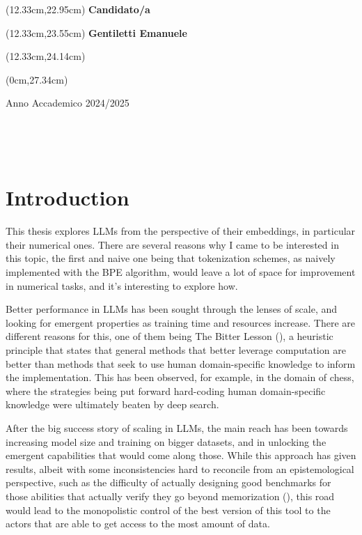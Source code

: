 \documentclass[
  a4paper, twoside, 10pt, titlepage]{book}
\begin{document}
\begin{textblock*}{8cm}(12.33cm,22.95cm)
	\noindent
	\textbf{Candidato/a}
\end{textblock*}
\begin{textblock*}{8cm}(12.33cm,23.55cm)
	\noindent	\textbf{Gentiletti Emanuele}
\end{textblock*}
\begin{textblock*}{8cm}(12.33cm,24.14cm)
\end{textblock*}

\begin{textblock*}{21cm}(0cm,27.34cm)
	\centerline{Anno Accademico 2024/2025}
\end{textblock*}

\endgroup

\newpage
$ $

\newpage
$ $


{
\setcounter{tocdepth}{2}
\tableofcontents
}
\mainmatter
\chapter{Introduction}\label{introduction}

This thesis explores LLMs from the perspective of their embeddings, in
particular their numerical ones. There are several reasons why I came to
be interested in this topic, the first and naive one being that
tokenization schemes, as naively implemented with the BPE algorithm,
would leave a lot of space for improvement in numerical tasks, and it's
interesting to explore how.

Better performance in LLMs has been sought through the lenses of scale,
and looking for emergent properties as training time and resources
increase. There are different reasons for this, one of them being The
Bitter Lesson (), a heuristic
principle that states that general methods that better leverage
computation are better than methods that seek to use human
domain-specific knowledge to inform the implementation. This has been
observed, for example, in the domain of chess, where the strategies
being put forward hard-coding human domain-specific knowledge were
ultimately beaten by deep search.

After the big success story of scaling in LLMs, the main reach has been
towards increasing model size and training on bigger datasets, and in
unlocking the emergent capabilities that would come along those. While
this approach has given results, albeit with some inconsistencies hard
to reconcile from an epistemological perspective, such as the difficulty
of actually designing good benchmarks for those abilities that actually
verify they go beyond memorization (), this road would lead to the monopolistic control of the best
version of this tool to the actors that are able to get access to the
most amount of data.
\end{document}
